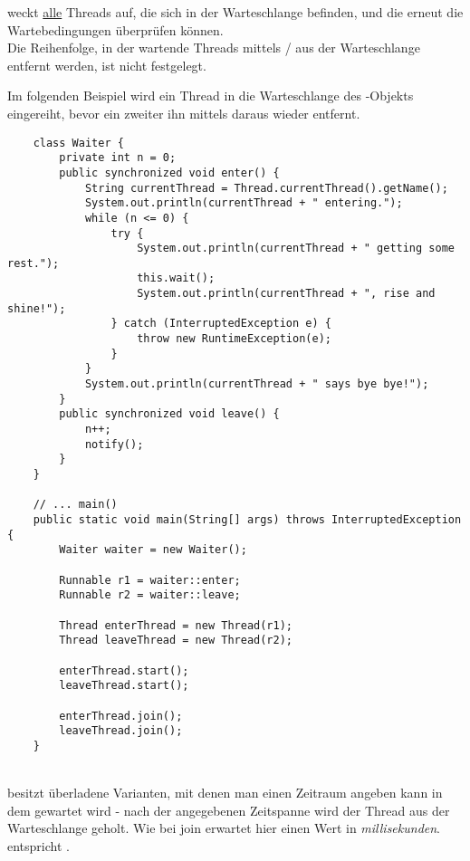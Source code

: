 \begin{center}
\end{center}
\noindent
weckt \ul{alle} Threads auf, die sich in der Warteschlange befinden, und die erneut die Wartebedingungen überprüfen können.\\
Die Reihenfolge, in der wartende Threads mittels / aus der Warteschlange entfernt werden, ist nicht festgelegt.

\newpage
\noindent
Im folgenden Beispiel wird ein Thread in die Warteschlange des -Objekts eingereiht, bevor ein zweiter ihn mittels  daraus wieder entfernt.
\begin{verbatim}
    class Waiter {
        private int n = 0;
        public synchronized void enter() {
            String currentThread = Thread.currentThread().getName();
            System.out.println(currentThread + " entering.");
            while (n <= 0) {
                try {
                    System.out.println(currentThread + " getting some rest.");
                    this.wait();
                    System.out.println(currentThread + ", rise and shine!");
                } catch (InterruptedException e) {
                    throw new RuntimeException(e);
                }
            }
            System.out.println(currentThread + " says bye bye!");
        }
        public synchronized void leave() {
            n++;
            notify();
        }
    }

    // ... main()
    public static void main(String[] args) throws InterruptedException {
        Waiter waiter = new Waiter();

        Runnable r1 = waiter::enter;
        Runnable r2 = waiter::leave;

        Thread enterThread = new Thread(r1);
        Thread leaveThread = new Thread(r2);

        enterThread.start();
        leaveThread.start();

        enterThread.join();
        leaveThread.join();
    }
\end{verbatim}\\

 besitzt überladene Varianten, mit denen man einen Zeitraum angeben kann in dem gewartet wird - nach der angegebenen Zeitspanne wird der Thread aus der Warteschlange geholt.
Wie bei join erwartet  hier einen Wert in \textit{millisekunden}.  entspricht .


